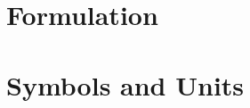 \documentclass[fleqn,10pt]{SelfArx} %
\begin{document}
\flushbottom    %
\maketitle      %
\tableofcontents

\thispagestyle{empty} %

\section{Formulation}


\section{Symbols and Units}




\end{document}
